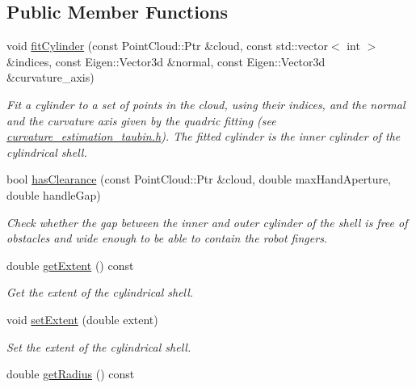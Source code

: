 \subsection*{\-Public \-Member \-Functions}
\begin{DoxyCompactItemize}
\item 
void \hyperlink{class_cylindrical_shell_a7077f354605189042d2c52bf00627bf3}{fit\-Cylinder} (const \-Point\-Cloud\-::\-Ptr \&cloud, const std\-::vector$<$ int $>$ \&indices, const \-Eigen\-::\-Vector3d \&normal, const \-Eigen\-::\-Vector3d \&curvature\-\_\-axis)
\begin{DoxyCompactList}\small\item\em \-Fit a cylinder to a set of points in the cloud, using their indices, and the normal and the curvature axis given by the quadric fitting (see \hyperlink{curvature__estimation__taubin_8h_source}{curvature\-\_\-estimation\-\_\-taubin.\-h}). \-The fitted cylinder is the inner cylinder of the cylindrical shell. \end{DoxyCompactList}\item 
bool \hyperlink{class_cylindrical_shell_abaa7b040007f1687c17e6e5ed7b0b99f}{has\-Clearance} (const \-Point\-Cloud\-::\-Ptr \&cloud, double max\-Hand\-Aperture, double handle\-Gap)
\begin{DoxyCompactList}\small\item\em \-Check whether the gap between the inner and outer cylinder of the shell is free of obstacles and wide enough to be able to contain the robot fingers. \end{DoxyCompactList}\item 
\hypertarget{class_cylindrical_shell_ada07b98bb7ff4e8f9051db282404d03c}{double \hyperlink{class_cylindrical_shell_ada07b98bb7ff4e8f9051db282404d03c}{get\-Extent} () const }\label{class_cylindrical_shell_ada07b98bb7ff4e8f9051db282404d03c}

\begin{DoxyCompactList}\small\item\em \-Get the extent of the cylindrical shell. \end{DoxyCompactList}\item 
void \hyperlink{class_cylindrical_shell_a1591a913744c2600787cf3d48511ba7a}{set\-Extent} (double extent)
\begin{DoxyCompactList}\small\item\em \-Set the extent of the cylindrical shell. \end{DoxyCompactList}\item 
\hypertarget{class_cylindrical_shell_a0852af3d18aa035cefe9e9d138a73ce1}{double \hyperlink{class_cylindrical_shell_a0852af3d18aa035cefe9e9d138a73ce1}{get\-Radius} () const }\label{class_cylindrical_shell_a0852af3d18aa035cefe9e9d138a73ce1}


\end{DoxyCompactItemize}
